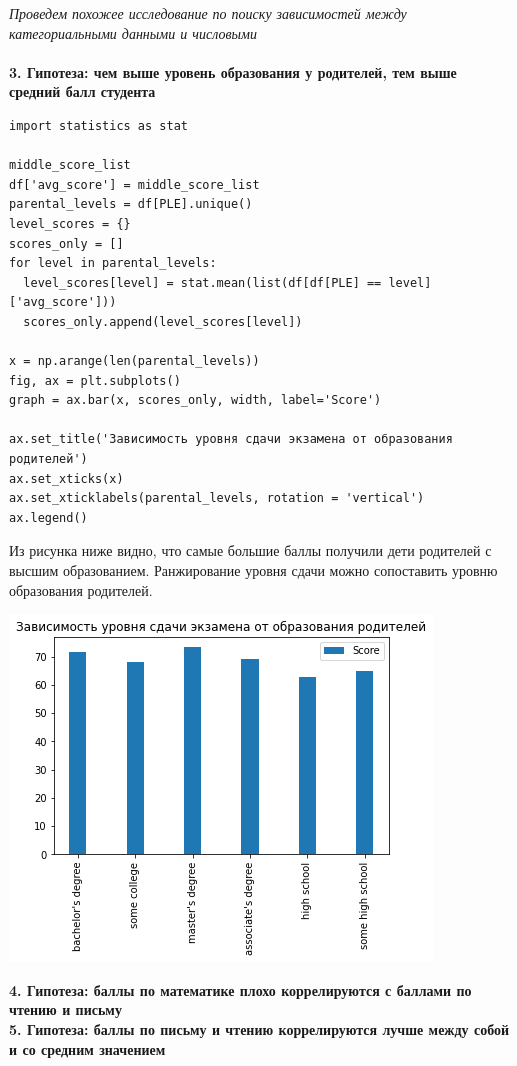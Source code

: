 \documentclass[12pt,a4paper]{article}
\begin{document}
\textit{Проведем похожее исследование по поиску зависимостей между категориальными данными и числовыми}
\\
\\
\textbf{3. Гипотеза: чем выше уровень образования у родителей, тем выше средний балл студента}


\begin{verbatim}
import statistics as stat

middle_score_list
df['avg_score'] = middle_score_list
parental_levels = df[PLE].unique()
level_scores = {}
scores_only = []
for level in parental_levels:  
  level_scores[level] = stat.mean(list(df[df[PLE] == level]['avg_score']))
  scores_only.append(level_scores[level])

x = np.arange(len(parental_levels))
fig, ax = plt.subplots()
graph = ax.bar(x, scores_only, width, label='Score')

ax.set_title('Зависимость уровня сдачи экзамена от образования родителей')
ax.set_xticks(x)
ax.set_xticklabels(parental_levels, rotation = 'vertical')
ax.legend()

\end{verbatim}

Из рисунка ниже видно, что самые большие баллы получили дети родителей с высшим образованием. Ранжирование уровня сдачи можно сопоставить уровню образования родителей.

\includegraphics{parental_degree_score}

\textbf{4. Гипотеза: баллы по математике плохо коррелируются с баллами по чтению и письму}\\

\textbf{5. Гипотеза: баллы по письму и чтению коррелируются лучше между собой и со средним значением}
\end{document}
